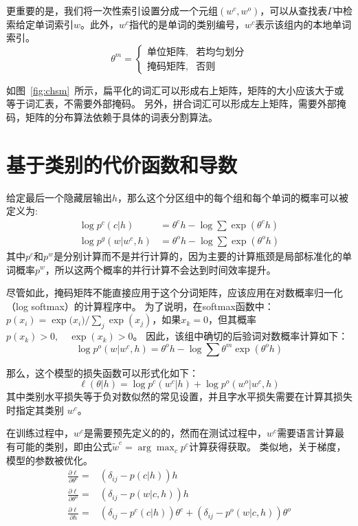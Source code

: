 更重要的是，我们将一次性索引设置分成一个元组$(w ^ c,w ^ o)$，可以从查找表$\Gamma $中检索给定单词索引$ w $。此外，$ w ^ c $指代的是单词的类别编号，$ w^c $表示该组内的本地单词索引。
\begin{equation}\label{equ:partition}
 \theta^m=
\begin{cases}
    \text{单位矩阵} ,& \text{若均匀划分} \\
    \text{掩码矩阵},   & \text{否则}
\end{cases}
\end{equation}


如图~\ref{fig:chsm}~所示，扁平化的词汇可以形成右上矩阵，矩阵的大小应该大于或等于词汇表，不需要外部掩码。
另外，拼合词汇可以形成左上矩阵，需要外部掩码，矩阵的分布算法依赖于具体的词表分割算法。

\section{基于类别的代价函数和导数}
给定最后一个隐藏层输出$ h $，那么这个分区组中的每个组和每个单词的概率可以被定义为:
\begin{equation}
\begin{split}
\log p^c(c|h) &= \theta^c h-\log \sum{\exp( \theta^c h )} \\
\log p^g(w|w^c,h)&=\theta^o h -\log\sum\exp{(\theta^o h)}
\end{split}
\end{equation}
其中$ p ^ c $和$ p ^ w $是分别计算而不是并行计算的，因为主要的计算瓶颈是局部标准化的单词概率$ p ^ w $，所以这两个概率的并行计算不会达到时间效率提升。


尽管如此，掩码矩阵不能直接应用于这个分词矩阵，应该应用在对数概率归一化（log softmax）的计算程序中。 为了说明，在softmax函数中：$ p(x_i)= {\exp({x_i}})/ {\sum_j \exp(x_j)} $，如果$ x_k = 0 $，但其概率$ p(x_k)> 0,\quad \exp(x_k)> 0 $。 因此，该组中确切的后验词对数概率计算如下：
\begin{equation}
  \log p^o(w|w^c,h)=\theta^o h -\log\sum\theta^m\exp(\theta^o h)
\end{equation}

那么，这个模型的损失函数可以形式化如下：
\begin{equation}
\ell(\theta|h) =\log p^c(w^c|h) +\log p^o(w^o|w^c,h)
\end{equation}
其中类别水平损失等于负对数似然的常见设置，并且字水平损失需要在计算其损失时指定其类别 $ w ^ c $。

在训练过程中，$ w ^ c $是需要预先定义的的，然而在测试过程中，$w^c$需要语言计算最有可能的类别，即由公式$\tilde w^c=\arg\max_c p^c$计算获得获取。 类似地，关于梯度，模型的参数被优化。
\begin{equation}
\begin{split}
\frac{\partial \ell}{\partial \theta^c}=& (\delta_{ij}-p(c|h))h \\
\frac{\partial \ell}{\partial \theta^o}=&(\delta_{ij}-p(w|c,h))h \\
\frac{\partial \ell}{\partial h}=&(\delta_{ij}-p^c(c|h))\theta^c + (\delta_{ij}-p^o(w|c,h))\theta^o
\end{split}
\end{equation}

